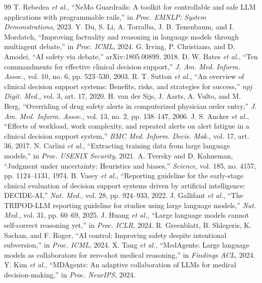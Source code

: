 \documentclass[journal]{IEEEtran}
\begin{document}
\begin{thebibliography}{99}
 T. Rebedea \emph{et al.}, ``NeMo Guardrails: A toolkit for controllable and safe LLM applications with programmable rails,'' in \emph{Proc. EMNLP: System Demonstrations}, 2023.
 Y. Du, S. Li, A. Torralba, J. B. Tenenbaum, and I. Mordatch, ``Improving factuality and reasoning in language models through multiagent debate,'' in \emph{Proc. ICML}, 2024.
 G. Irving, P. Christiano, and D. Amodei, ``AI safety via debate,'' arXiv:1805.00899, 2018.
 D. W. Bates \emph{et al.}, ``Ten commandments for effective clinical decision support,'' \emph{J. Am. Med. Inform. Assoc.}, vol. 10, no. 6, pp. 523--530, 2003.
 R. T. Sutton \emph{et al.}, ``An overview of clinical decision support systems: Benefits, risks, and strategies for success,'' \emph{npj Digit. Med.}, vol. 3, art. 17, 2020.
 H. van der Sijs, J. Aarts, A. Vulto, and M. Berg, ``Overriding of drug safety alerts in computerized physician order entry,'' \emph{J. Am. Med. Inform. Assoc.}, vol. 13, no. 2, pp. 138--147, 2006.
 J. S. Ancker \emph{et al.}, ``Effects of workload, work complexity, and repeated alerts on alert fatigue in a clinical decision support system,'' \emph{BMC Med. Inform. Decis. Mak.}, vol. 17, art. 36, 2017.
 N. Carlini \emph{et al.}, ``Extracting training data from large language models,'' in \emph{Proc. USENIX Security}, 2021.
 A. Tversky and D. Kahneman, ``Judgment under uncertainty: Heuristics and biases,'' \emph{Science}, vol. 185, no. 4157, pp. 1124--1131, 1974.
 B. Vasey \emph{et al.}, ``Reporting guideline for the early-stage clinical evaluation of decision support systems driven by artificial intelligence: DECIDE-AI,'' \emph{Nat. Med.}, vol. 28, pp. 924--933, 2022.
 J. Gallifant \emph{et al.}, ``The TRIPOD-LLM reporting guideline for studies using large language models,'' \emph{Nat. Med.}, vol. 31, pp. 60--69, 2025.
 J. Huang \emph{et al.}, ``Large language models cannot self-correct reasoning yet,'' in \emph{Proc. ICLR}, 2024.
 R. Greenblatt, B. Shlegeris, K. Sachan, and F. Roger, ``AI control: Improving safety despite intentional subversion,'' in \emph{Proc. ICML}, 2024.
 X. Tang \emph{et al.}, ``MedAgents: Large language models as collaborators for zero-shot medical reasoning,'' in \emph{Findings ACL}, 2024.
 Y. Kim \emph{et al.}, ``MDAgents: An adaptive collaboration of LLMs for medical decision-making,'' in \emph{Proc. NeurIPS}, 2024.

\end{thebibliography}
\end{document}
